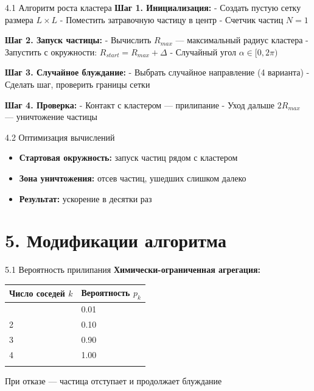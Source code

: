 \documentclass[
  ignorenonframetext,
  aspectratio=169,
  russian,
]{beamer}
\providecommand{\tightlist}{%
  \setlength{\itemsep}{0pt}\setlength{\parskip}{0pt}}
\begin{document}
\begin{frame}{4.1 Алгоритм роста кластера}
\label{ux430ux43bux433ux43eux440ux438ux442ux43c-ux440ux43eux441ux442ux430-ux43aux43bux430ux441ux442ux435ux440ux430}
\textbf{Шаг 1. Инициализация:} - Создать пустую сетку размера
\(L \times L\) - Поместить затравочную частицу в центр - Счетчик частиц
\(N = 1\)

\textbf{Шаг 2. Запуск частицы:} - Вычислить \(R_{max}\) --- максимальный
радиус кластера - Запустить с окружности:
\(R_{start} = R_{max} + \Delta\) - Случайный угол
\(\alpha \in [0, 2\pi)\)

\textbf{Шаг 3. Случайное блуждание:} - Выбрать случайное направление (4
варианта) - Сделать шаг, проверить границы сетки

\textbf{Шаг 4. Проверка:} - Контакт с кластером --- прилипание - Уход
дальше \(2R_{max}\) --- уничтожение частицы
\end{frame}

\begin{frame}{4.2 Оптимизация вычислений}
\label{ux43eux43fux442ux438ux43cux438ux437ux430ux446ux438ux44f-ux432ux44bux447ux438ux441ux43bux435ux43dux438ux439}
\begin{itemize}
\tightlist
\item
  \textbf{Стартовая окружность:} запуск частиц рядом с кластером
\item
  \textbf{Зона уничтожения:} отсев частиц, ушедших слишком далеко
\item
  \textbf{Результат:} ускорение в десятки раз
\end{itemize}
\end{frame}

\section{5. Модификации
алгоритма}\label{ux43cux43eux434ux438ux444ux438ux43aux430ux446ux438ux438-ux430ux43bux433ux43eux440ux438ux442ux43cux430}

\begin{frame}{5.1 Вероятность прилипания}
\label{ux432ux435ux440ux43eux44fux442ux43dux43eux441ux442ux44c-ux43fux440ux438ux43bux438ux43fux430ux43dux438ux44f}
\textbf{Химически-ограниченная агрегация:}

\begin{longtable}[]{@{}ll@{}}
\toprule\noalign{}
Число соседей \(k\) & Вероятность \(p_k\) \\
\midrule\noalign{}
\endhead
1 & 0.01 \\
2 & 0.10 \\
3 & 0.90 \\
4 & 1.00 \\
\bottomrule\noalign{}
\end{longtable}

При отказе --- частица отступает и продолжает блуждание
\end{frame}
\end{document}

